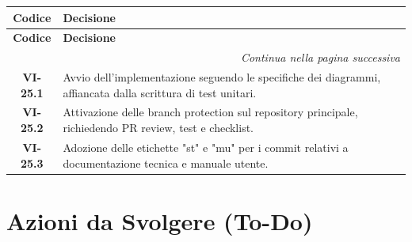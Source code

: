 \renewcommand{\arraystretch}{1.3}
\vspace{-0.3cm}
\noindent
\begin{longtable}{c p{12cm}}
	\toprule
	\textbf{Codice} & \textbf{Decisione} \\
	\midrule
	\endfirsthead

	\toprule
	\textbf{Codice} & \textbf{Decisione} \\
	\midrule
	\endhead

	\midrule
	\multicolumn{2}{r}{\textit{Continua nella pagina successiva}} \\
	\midrule
	\endfoot

	\bottomrule
	\endlastfoot

	\textbf{VI-25.1} & {Avvio dell'implementazione seguendo le specifiche dei diagrammi, affiancata dalla scrittura di test unitari.} \\
	\textbf{VI-25.2} & {Attivazione delle branch protection sul repository principale, richiedendo PR review, test e checklist.} \\
	\textbf{VI-25.3} & {Adozione delle etichette "st" e "mu" per i commit relativi a documentazione tecnica e manuale utente.} \\
	
\end{longtable}

\section{Azioni da Svolgere (To-Do)}

